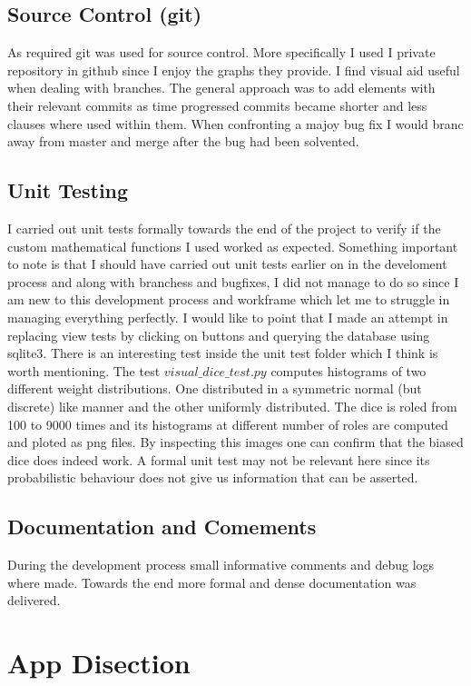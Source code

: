 \documentclass[11pt]{article}
\begin{document}
\subsection{Source Control (git)}
 As required git was used for source control. More specifically I used I private repository in github since I enjoy the graphs they provide. I find visual aid useful when dealing with branches.
 \newline
 The general approach was to add elements with their relevant commits as time progressed commits became shorter and less clauses where used within them. When confronting a majoy bug fix I would branc away from master and merge after the bug had been solvented.

\subsection{Unit Testing}
I carried out unit tests formally towards the end of the project to verify if the custom mathematical functions I used worked as expected. Something important to note is that I should have carried out unit tests earlier on in the develoment process and along with branchess and bugfixes, I did not manage to do so since I am new to this development process and workframe which let me to struggle in managing everything perfectly.
\newline
 I would like to point that I made an attempt in replacing view tests by clicking on buttons and querying the database using sqlite3.
\newline
There is an interesting test inside the unit test folder which I think is worth mentioning. The test $visual\_dice\_test.py$ computes histograms
of two different weight distributions. One distributed in a symmetric normal (but discrete) like manner and the other uniformly distributed.
The dice is roled from 100 to 9000 times and its histograms at different number of roles are computed and ploted as png files. By inspecting this images one can confirm that the biased dice does indeed work. A formal unit test may not be relevant here since its probabilistic behaviour does not give us information that can be asserted.  

\subsection{Documentation and Comements}
During the development process small informative comments and debug logs where made. Towards the end more formal and dense documentation was delivered.

\section{App Disection}
\end{document}
